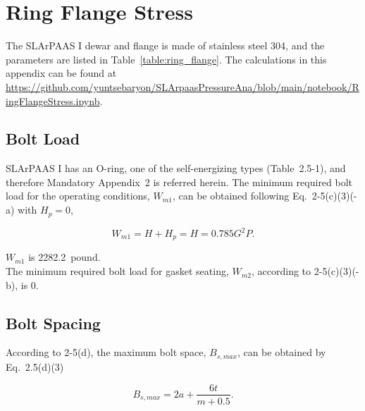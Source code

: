 \section{Ring Flange Stress}
\label{app:ring_flange}


The SLArPAAS I dewar and flange is made of stainless steel 304,
and the parameters are listed in Table~\ref{table:ring_flange}.
The calculations in this appendix can be found at
\url{https://github.com/yuntsebaryon/SLArpaasPressureAna/blob/main/notebook/RingFlangeStress.ipynb}.\\



\subsection{Bolt Load}
\label{app:bolt_load}

SLArPAAS I has an O-ring, one of the self-energizing types (Table~2.5-1),
and therefore Mandatory Appendix~2 is referred herein.
The minimum required bolt load for the operating conditions,
$W_{m1}$, can be obtained following Eq.~2-5(c)(3)(-a) with $H_p = 0$,

\begin{equation}
    W_{m1} = H + H_p = H = 0.785G^2 P.
\end{equation}

$W_{m1}$ is 2282.2~pound.\\

The minimum required bolt load for gasket seating, $W_{m2}$, according to
2-5(c)(3)(-b), is 0.

\subsection{Bolt Spacing}
\label{app:bolt_spacing}

According to 2-5(d), the maximum bolt space, $B_{s,max}$, can be obtained
by Eq.~2.5(d)(3)

\begin{equation}
    B_{s,max} = 2a + \frac{6t}{m+0.5}.
\end{equation}

